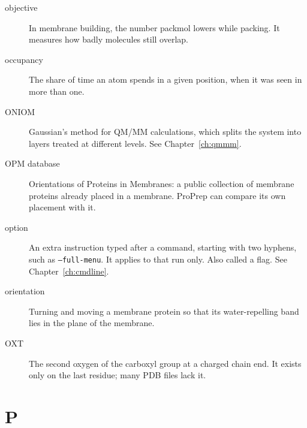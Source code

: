 \begin{description}
\item[objective] In membrane building, the number packmol lowers while
  packing. It measures how badly molecules still overlap.
\item[occupancy] The share of time an atom spends in a given position, when it
  was seen in more than one.
\item[ONIOM] Gaussian's method for QM/MM calculations, which splits the system
  into layers treated at different levels. See Chapter~\ref{ch:qmmm}.
\item[OPM database] Orientations of Proteins in Membranes: a public collection
  of membrane proteins already placed in a membrane. ProPrep can compare its
  own placement with it.
\item[option] An extra instruction typed after a command, starting with two
  hyphens, such as \texttt{--full-menu}. It applies to that run only. Also
  called a flag. See Chapter~\ref{ch:cmdline}.
\item[orientation] Turning and moving a membrane protein so that its
  water-repelling band lies in the plane of the membrane.
\item[OXT] The second oxygen of the carboxyl group at a charged chain end. It
  exists only on the last residue; many PDB files lack it.
\end{description}

\section*{P}

